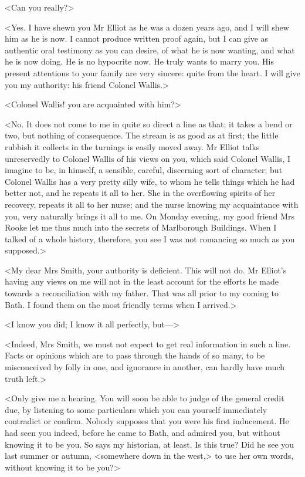 <Can you really?>

<Yes. I have shewn you Mr Elliot as he was a dozen years ago, and I will shew him as he is now. I cannot produce written proof again, but I can give as authentic oral testimony as you can desire, of what he is now wanting, and what he is now doing. He is no hypocrite now. He truly wants to marry you. His present attentions to your family are very sincere: quite from the heart. I will give you my authority: his friend Colonel Wallis.>

<Colonel Wallis! you are acquainted with him?>

<No. It does not come to me in quite so direct a line as that; it takes a bend or two, but nothing of consequence. The stream is as good as at first; the little rubbish it collects in the turnings is easily moved away. Mr Elliot talks unreservedly to Colonel Wallis of his views on you, which said Colonel Wallis, I imagine to be, in himself, a sensible, careful, discerning sort of character; but Colonel Wallis has a very pretty silly wife, to whom he tells things which he had better not, and he repeats it all to her. She in the overflowing spirits of her recovery, repeats it all to her nurse; and the nurse knowing my acquaintance with you, very naturally brings it all to me. On Monday evening, my good friend Mrs Rooke let me thus much into the secrets of Marlborough Buildings. When I talked of a whole history, therefore, you see I was not romancing so much as you supposed.>

<My dear Mrs Smith, your authority is deficient. This will not do. Mr Elliot's having any views on me will not in the least account for the efforts he made towards a reconciliation with my father. That was all prior to my coming to Bath. I found them on the most friendly terms when I arrived.>

<I know you did; I know it all perfectly, but—>

<Indeed, Mrs Smith, we must not expect to get real information in such a line. Facts or opinions which are to pass through the hands of so many, to be misconceived by folly in one, and ignorance in another, can hardly have much truth left.>

<Only give me a hearing. You will soon be able to judge of the general credit due, by listening to some particulars which you can yourself immediately contradict or confirm. Nobody supposes that you were his first inducement. He had seen you indeed, before he came to Bath, and admired you, but without knowing it to be you. So says my historian, at least. Is this true? Did he see you last summer or autumn, <somewhere down in the west,> to use her own words, without knowing it to be you?>

